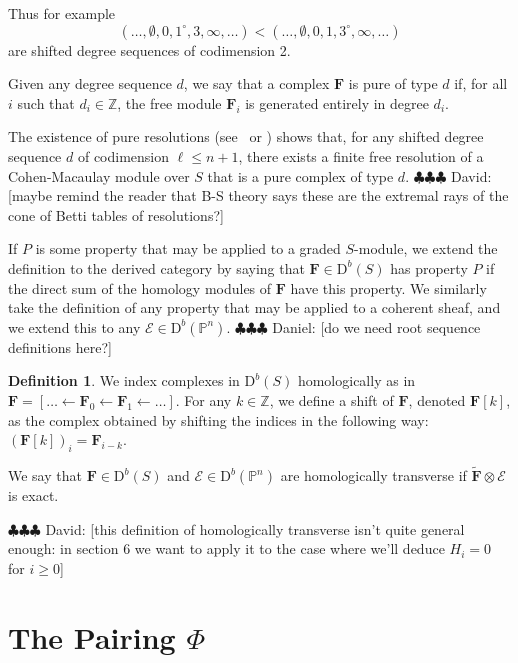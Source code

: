 \documentclass[12pt]{amsart}
\theoremstyle{definition}
\newtheorem{defn}[lemma]{Definition}
\theoremstyle{remark}
\newcommand{\PP}{\mathbb{P}}
\newcommand{\ZZ}{\mathbb{Z}}
\newcommand{\cE}{\mathcal{E}}
\newcommand{\FF}{\mathbf{F}}
\newcommand{\defi}[1]{\textsf{#1}} %
\newcommand{\DD}{\mathrm{D}}
\newcommand{\daniel}[1]{{\color{green} \sf $\clubsuit\clubsuit\clubsuit$ Daniel: [#1]}}
\newcommand{\david}[1]{{\color{red} \sf $\clubsuit\clubsuit\clubsuit$ David: [#1]}}
\begin{document}
Thus for example
$$
(\dots, \emptyset , 0, 1^{\circ}, 3, \infty, \dots) < (\dots, \emptyset , 0, 1, 3^{\circ}, \infty, \dots) 
$$
are shifted degree sequences of codimension 2.

Given any degree sequence $d$, we say that a complex $\FF$ is \defi{pure of type $d$} if, for all $i$ such that $d_i\in \ZZ$, the free module $\FF_i$ is generated entirely in degree $d_i$. 

The existence of pure resolutions (see~\cite{efw} or \cite[\S5]{eis-schrey1}) shows that, for any shifted degree sequence $d$ of codimension $\ell\leq n+1$, there exists a  finite free resolution of a Cohen-Macaulay module over $S$ that is a pure complex of type $d$.  \david{maybe remind the reader that B-S theory says these are the extremal rays of the cone of Betti tables of resolutions?}


If $P$ is some property that may be applied to a graded $S$-module, we extend the definition to the derived category by saying that $\FF \in \DD^b(S)$ has property $P$ if the direct sum of the homology modules of $\FF$ have this property. We similarly take the definition of any property that may be applied to a coherent sheaf, and we extend this to any $\cE\in \DD^b(\PP^n)$.  \daniel{do we need root sequence definitions here?}

\begin{defn}
We index complexes in $\DD^b(S)$ homologically as in $\FF=[\dots \gets \FF_0\gets \FF_1\gets \dots]$.  For any $k\in \ZZ$, we define a \defi{shift} of $\FF$, denoted $\FF[k]$, as the complex obtained by shifting the indices in the following way:  $(\FF[k])_i=\FF_{i-k}$.
\end{defn}

We say that $\FF\in \DD^b(S)$ and $\cE\in \DD^b(\PP^n)$ are \defi{homologically transverse} if $\widetilde{\FF}\otimes \cE$ is exact.

\david{this definition of homologically transverse isn't quite general enough: in section 6 we want to apply it to the case where we'll deduce $H_{i} = 0$ for $i\geq 0$} 

\section{The Pairing $\Phi$}\label{sec:duality pairing}
\end{document}
